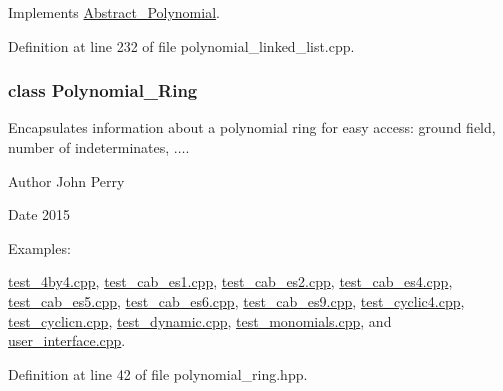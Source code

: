 Implements \hyperlink{group__polygroup_a12e023570eb675343c4b7ed635a031dc}{Abstract\+\_\+\+Polynomial}.



Definition at line 232 of file polynomial\+\_\+linked\+\_\+list.\+cpp.

\label{class_polynomial___ring}
\subsubsection{class Polynomial\+\_\+\+Ring}
Encapsulates information about a polynomial ring for easy access\+: ground field, number of indeterminates, {$\dots$}. 

\begin{DoxyAuthor}{Author}
John Perry 
\end{DoxyAuthor}
\begin{DoxyDate}{Date}
2015 
\end{DoxyDate}
\begin{Desc}
\item[Examples\+: ]\par
\hyperlink{test_4by4_8cpp-example}{test\+\_\+4by4.\+cpp}, \hyperlink{test_cab_es1_8cpp-example}{test\+\_\+cab\+\_\+es1.\+cpp}, \hyperlink{test_cab_es2_8cpp-example}{test\+\_\+cab\+\_\+es2.\+cpp}, \hyperlink{test_cab_es4_8cpp-example}{test\+\_\+cab\+\_\+es4.\+cpp}, \hyperlink{test_cab_es5_8cpp-example}{test\+\_\+cab\+\_\+es5.\+cpp}, \hyperlink{test_cab_es6_8cpp-example}{test\+\_\+cab\+\_\+es6.\+cpp}, \hyperlink{test_cab_es9_8cpp-example}{test\+\_\+cab\+\_\+es9.\+cpp}, \hyperlink{test_cyclic4_8cpp-example}{test\+\_\+cyclic4.\+cpp}, \hyperlink{test_cyclicn_8cpp-example}{test\+\_\+cyclicn.\+cpp}, \hyperlink{test_dynamic_8cpp-example}{test\+\_\+dynamic.\+cpp}, \hyperlink{test_monomials_8cpp-example}{test\+\_\+monomials.\+cpp}, and \hyperlink{user_interface_8cpp-example}{user\+\_\+interface.\+cpp}.\end{Desc}


Definition at line 42 of file polynomial\+\_\+ring.\+hpp.

